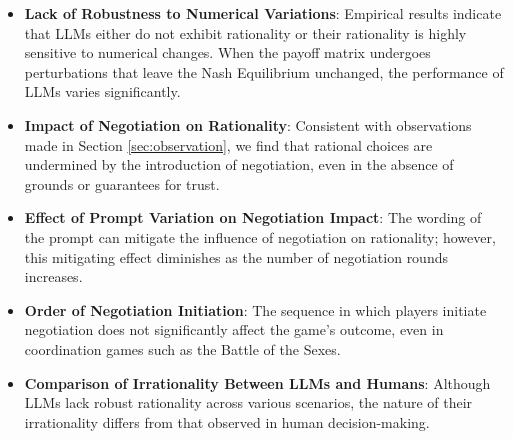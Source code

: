 \begin{minipage}[t]{1\linewidth} 
\begin{tcolorbox}[colback=gray!5,colframe=blue!40!black,title=Summary for raw-LLM v. workflow-LLM and workflow-LLM v. raw-LLM]
\begin{itemize} 
\item \textbf{Lack of Robustness to Numerical Variations}: Empirical results indicate that LLMs either do not exhibit rationality or their rationality is highly sensitive to numerical changes. When the payoff matrix undergoes perturbations that leave the Nash Equilibrium unchanged, the performance of LLMs varies significantly.
\item \textbf{Impact of Negotiation on Rationality}: Consistent with observations made in Section \ref{sec:observation}, we find that rational choices are undermined by the introduction of negotiation, even in the absence of grounds or guarantees for trust.
\item \textbf{Effect of Prompt Variation on Negotiation Impact}: The wording of the prompt can mitigate the influence of negotiation on rationality; however, this mitigating effect diminishes as the number of negotiation rounds increases.
\item \textbf{Order of Negotiation Initiation}: The sequence in which players initiate negotiation does not significantly affect the game's outcome, even in coordination games such as the Battle of the Sexes.
\item \textbf{Comparison of Irrationality Between LLMs and Humans}: Although LLMs lack robust rationality across various scenarios, the nature of their irrationality differs from that observed in human decision-making.
\end{itemize}
\end{tcolorbox} 
\end{minipage}
